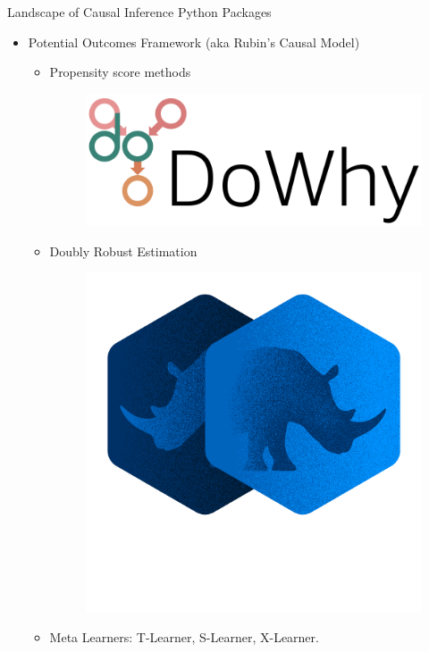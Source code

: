 \documentclass{beamer}
\begin{document}
\begin{frame}{Landscape of Causal Inference Python Packages}
	\begin{itemize}
		\item Potential Outcomes Framework (aka Rubin's Causal Model)
			\begin{itemize}
				\item Propensity score methods
					\begin{figure}
						\includegraphics[scale=0.1]{imgs/dowhy.png}
					\end{figure}
				\item Doubly Robust Estimation
					\begin{figure}
						\includegraphics[scale=0.1]{imgs/doubleml.png}
					\end{figure}
				\item Meta Learners: T-Learner, S-Learner, X-Learner.

\end{itemize}
\end{itemize}
\end{frame}
\end{document}
